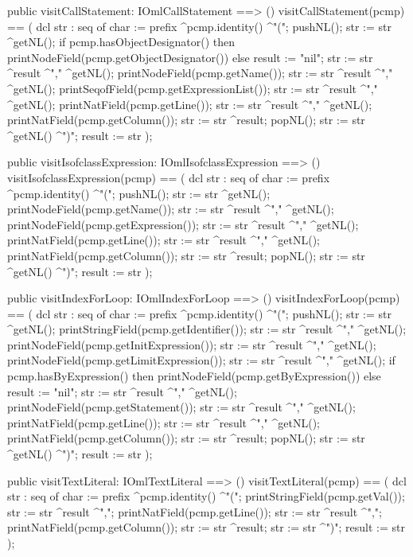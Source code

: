 \begin{vdm_al}
  public visitCallStatement: IOmlCallStatement ==> ()
  visitCallStatement(pcmp) ==
    ( dcl str : seq of char := prefix ^pcmp.identity() ^"(";
      pushNL();
      str := str ^getNL();
      if pcmp.hasObjectDesignator()
      then printNodeField(pcmp.getObjectDesignator())
      else result := "nil";
      str := str ^result ^"," ^getNL();
      printNodeField(pcmp.getName());
      str := str ^result ^"," ^getNL();
      printSeqofField(pcmp.getExpressionList());
      str := str ^result ^"," ^getNL();
      printNatField(pcmp.getLine());
      str := str ^result ^"," ^getNL();
      printNatField(pcmp.getColumn());
      str := str ^result;
      popNL();
      str := str ^getNL() ^")";
      result := str );

  public visitIsofclassExpression: IOmlIsofclassExpression ==> ()
  visitIsofclassExpression(pcmp) ==
    ( dcl str : seq of char := prefix ^pcmp.identity() ^"(";
      pushNL();
      str := str ^getNL();
      printNodeField(pcmp.getName());
      str := str ^result ^"," ^getNL();
      printNodeField(pcmp.getExpression());
      str := str ^result ^"," ^getNL();
      printNatField(pcmp.getLine());
      str := str ^result ^"," ^getNL();
      printNatField(pcmp.getColumn());
      str := str ^result;
      popNL();
      str := str ^getNL() ^")";
      result := str );

  public visitIndexForLoop: IOmlIndexForLoop ==> ()
  visitIndexForLoop(pcmp) ==
    ( dcl str : seq of char := prefix ^pcmp.identity() ^"(";
      pushNL();
      str := str ^getNL();
      printStringField(pcmp.getIdentifier());
      str := str ^result ^"," ^getNL();
      printNodeField(pcmp.getInitExpression());
      str := str ^result ^"," ^getNL();
      printNodeField(pcmp.getLimitExpression());
      str := str ^result ^"," ^getNL();
      if pcmp.hasByExpression()
      then printNodeField(pcmp.getByExpression())
      else result := "nil";
      str := str ^result ^"," ^getNL();
      printNodeField(pcmp.getStatement());
      str := str ^result ^"," ^getNL();
      printNatField(pcmp.getLine());
      str := str ^result ^"," ^getNL();
      printNatField(pcmp.getColumn());
      str := str ^result;
      popNL();
      str := str ^getNL() ^")";
      result := str );

  public visitTextLiteral: IOmlTextLiteral ==> ()
  visitTextLiteral(pcmp) ==
    ( dcl str : seq of char := prefix ^pcmp.identity() ^"(";
      printStringField(pcmp.getVal());
      str := str ^result ^",";
      printNatField(pcmp.getLine());
      str := str ^result ^",";
      printNatField(pcmp.getColumn());
      str := str ^result;
      str := str ^")";
      result := str );


\end{vdm_al}
